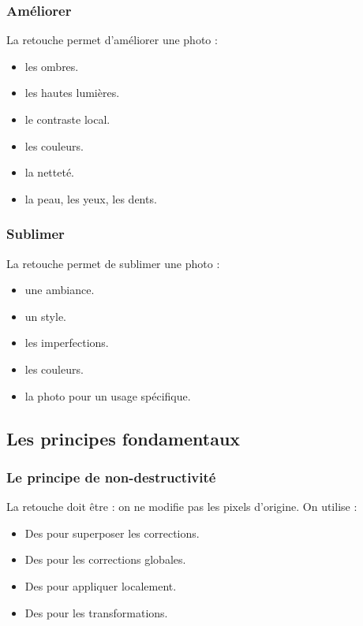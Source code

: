 \subsubsection{Améliorer}

La retouche permet d'améliorer une photo :

\begin{itemize}
    \item {} les ombres.
    \item {} les hautes lumières.
    \item {} le contraste local.
    \item {} les couleurs.
    \item {} la netteté.
    \item {} la peau, les yeux, les dents.
\end{itemize}

\subsubsection{Sublimer}

La retouche permet de sublimer une photo :

\begin{itemize}
    \item {} une ambiance.
    \item {} un style.
    \item {} les imperfections.
    \item {} les couleurs.
    \item {} la photo pour un usage spécifique.
\end{itemize}

\subsection{Les principes fondamentaux}

\subsubsection{Le principe de non-destructivité}

La retouche doit être  : on ne modifie pas les pixels d'origine. On utilise :

\begin{itemize}
    \item Des  pour superposer les corrections.
    \item Des  pour les corrections globales.
    \item Des  pour appliquer localement.
    \item Des  pour les transformations.
\end{itemize}

